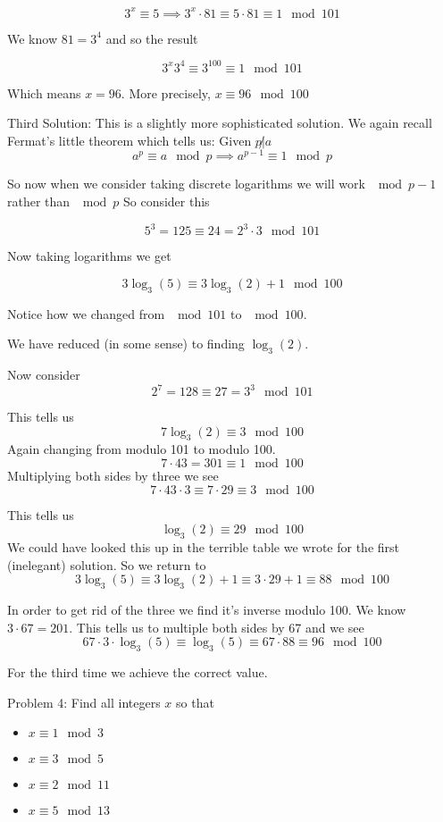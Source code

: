 \documentclass[16 pt]{amsart}
\theoremstyle{definition}
\theoremstyle{remark}
\numberwithin{equation}{subsection}
\begin{document}
\[
3^x \equiv 5 \implies 3^x \cdot 81 \equiv 5\cdot 81 \equiv 1 \mod{101}
\]

We know $81 = 3^4$ and so the result

\[
3^x 3^4 \equiv 3^{100} \equiv 1 \mod{101}
\]

Which means $x=96$.  More precisely, $x\equiv 96 \mod{100}$

\vspace{.25in}

Third Solution:  This is a slightly more sophisticated solution.  We again recall Fermat's little theorem which tells us: Given $p \not| a$
\[
a^p \equiv a \mod{p} \implies a^{p-1} \equiv 1\mod{p}
\]

So now when we consider taking discrete logarithms we will work $\mod{p-1}$ rather than $\mod{p}$ So consider this

\[
5^3 = 125 \equiv 24 = 2^3 \cdot 3 \mod{101}
\]

Now taking logarithms we get

\[
3\log_3(5) \equiv 3\log_3(2) + 1 \mod{100}
\]

Notice how we changed from $\mod{101}$ to $\mod{100}$.

We have reduced (in some sense) to finding $\log_3(2)$.

Now consider
\[
2^7 = 128 \equiv 27 = 3^3 \mod{101}
\]

This tells us
\[
7\log_3(2) \equiv 3 \mod{100}
\]
Again changing from modulo 101 to modulo 100.
\[
7\cdot 43 = 301 \equiv 1 \mod{100}
\]
Multiplying both sides by three we see
\[
7\cdot 43 \cdot 3 \equiv 7\cdot 29 \equiv 3 \mod{100}
\]

This tells us
\[
\log_3(2) \equiv 29 \mod{100}
\]
We could have looked this up in the terrible table we wrote for the first (inelegant) solution.
So we return to
\[
3\log_3(5) \equiv 3\log_3(2) + 1 \equiv 3\cdot 29 + 1 \equiv 88\mod{100}
\]

In order to get rid of the three we find it's inverse modulo 100.  We know $3\cdot 67 = 201$.
This tells us to multiple both sides by 67 and we see
\[
67\cdot 3 \cdot \log_3(5) \equiv \log_3(5) \equiv 67\cdot 88 \equiv 96 \mod{100}
\]

For the third time we achieve the correct value.

\newpage


Problem 4: Find all integers $x$ so that
\begin{itemize}
\item[] $x \equiv 1\mod{3}$\\
\item[] $x \equiv 3\mod{5}$\\
\item[] $x \equiv 2\mod{11}$\\
\item[] $x \equiv 5\mod{13}$\\
\end{itemize}
\end{document}
